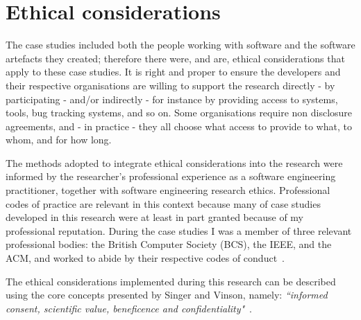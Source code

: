\section{Ethical considerations}
\label{methodology-ethical-considerations-section}
The case studies included both the people working with software and the software artefacts they created; therefore there were, and are, ethical considerations that apply to these case studies. 
It is right and proper to ensure the developers and their respective organisations are willing to support the research directly - by participating - and/or indirectly - for instance by providing access to systems, tools, bug tracking systems, and so on. Some organisations require non disclosure agreements, and - in practice - they all choose what access to provide to what, to whom, and for how long. 


The methods adopted to integrate ethical considerations into the research were informed by the researcher's professional experience as a software engineering practitioner, together with software engineering research ethics. Professional codes of practice are relevant in this context because many of case studies developed in this research were at least in part granted because of my professional reputation. During the case studies I was  a member of three relevant professional bodies: the British Computer Society (BCS), the IEEE, and the ACM, and worked to abide by their respective codes of conduct~\citep{bcs_code_of_conduct_2021, ieee_and_acm_code_1999on}.

The ethical considerations implemented during this research can be described using the core concepts presented by Singer and Vinson, namely: \emph{``informed consent, scientific value, beneficence and confidentiality"}~\citep[p.1178]{singer2002_ethical_issues_in_empirical_studies_of_software_engineering}. 



